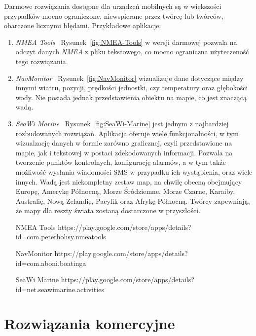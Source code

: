 \documentclass[skorowidz,skroty]{dyplomWEZUT}
\begin{document}
Darmowe rozwiązania dostępne dla urządzeń mobilnych są w większości przypadków mocno ograniczone, niewspierane przez twórcę lub twórców, obarczone licznymi błędami. Przykładowe aplikacje:
\begin{enumerate}

\item \textit{NMEA Tools} \cite{NMEATools} ~Rysunek~\ref{fig:NMEA-Tools} w wersji darmowej pozwala na odczyt danych \textit{NMEA} z pliku tekstowego, co mocno ograniczna użyteczeność tego rozwiązania. 

\item \textit{NavMonitor} \cite{NavMonitor} ~Rysunek~\ref{fig:NavMonitor} wizualizuje dane dotyczące między innymi wiatru, pozycji, prędkości jednostki, czy temperatury oraz głębokości wody. Nie posiada jednak przedstawienia obiektu na mapie, co jest znaczącą wadą. 

\item \textit{SeaWi Marine} \cite{SeaWiMarine} ~Rysunek~\ref{fig:SeaWi-Marine} jest jednym z najbardziej rozbudowanych rozwiązań. Aplikacja oferuje wiele funkcjonalności, w tym wizualzację danych w formie zarówno graficznej, czyli przedstawione na mapie, jak i tekstowej w postaci zdekodowanych informacji. Pozwala na tworzenie punktów kontrolnych, konfigurację alarmów, a w tym także możliwość wysłania wiadomości SMS w przypadku ich wystąpienia, oraz wiele innych. Wadą jest niekompletny zestaw map, na chwilę obecną obejmujący Europę, Amerykę Północną, Morze Śródziemne, Morze Czarne, Karaiby, Australię, Nową Zelandię, Pacyfik oraz Afrykę Północną. Twórcy zapewniają, że mapy dla reszty świata zostaną dostarczone w przyszłości.

{NMEA Tools \label{fig:NMEA-Tools}}
{https://play.google.com/store/apps/details?id=com.peterhohsy.nmeatools}

{NavMonitor \label{fig:NavMonitor}}
{https://play.google.com/store/apps/details?id=com.aboni.boatinga}

{SeaWi Marine \label{fig:SeaWi-Marine}}
{https://play.google.com/store/apps/details?id=net.seawimarine.activities}

\end{enumerate}
\newpage
\section{Rozwiązania komercyjne}\label{chap: Commercial solutions}
\end{document}
